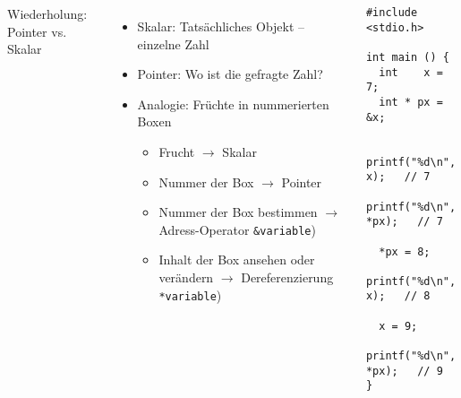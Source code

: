 \begin{frame}[fragile]
%
\begin{columns}[T]
\begin{Large}
{Wiederholung: Pointer vs. Skalar}
\vspace{6pt}
\end{Large}
%
\begin{itemize}
\item Skalar: Tatsächliches Objekt -- einzelne Zahl
\item Pointer: Wo ist die gefragte Zahl?
\item Analogie: Früchte in nummerierten Boxen
	\begin{itemize}
	\item Frucht         \tab $\rightarrow$ Skalar
	\item Nummer der Box \tab $\rightarrow$ Pointer 
	\item Nummer der Box bestimmen \newline
		$\rightarrow$ Adress-Operator \texttt{\&variable})
	\item Inhalt der Box ansehen oder verändern \newline
		$\rightarrow$ Dereferenzierung \texttt{*variable})
	\end{itemize}
\end{itemize}
%
\begin{codebox}
\begin{verbatim}
#include <stdio.h>

int main () {
  int    x =  7;
  int * px = &x;
  
  printf("%d\n",   x);   // 7
  printf("%d\n", *px);   // 7
  
  *px = 8;
  printf("%d\n",   x);   // 8
  
  x = 9;
  printf("%d\n", *px);   // 9
}
\end{verbatim}
\end{codebox}
\end{columns}
%
\end{frame}


